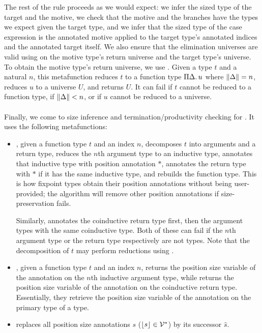 The rest of the rule proceeds as we would expect: we infer the sized type of the target and the motive, we check that the motive and the branches have the types we expect given the target type, and we infer that the sized type of the case expression is the annotated motive applied to the target type's annotated indices and the annotated target itself.
We also ensure that the elimination universes are valid using \elim on the motive type's return universe and the target type's universe.
To obtain the motive type's return universe, we use \decompose.
Given a type $t$ and a natural $n$, this metafunction reduces $t$ to a function type $\Pi \Delta \mathpunct{.} u$ where $\lVert\Delta\rVert = n$, reduces $u$ to a universe $U$, and returns $U$.
It can fail if $t$ cannot be reduced to a function type, if $\lVert\Delta\rVert < n$, or if $u$ cannot be reduced to a universe.

\paragraph*{} Finally, we come to size inference and termination/productivity checking for \cofixpoints.
It uses the following metafunctions:
\begin{itemize}
  \item \setrecstars, given a function type $t$ and an index $n$, decomposes $t$ into arguments and a return type, reduces the $n$th argument type to an inductive type, annotates that inductive type with position annotation $*$, annotates the return type with $*$ if it has the same inductive type, and rebuilds the function type.
    This is how fixpoint types obtain their position annotations without being user-provided; the algorithm will remove other position annotations if size-preservation fails.
    
    Similarly, \setcorecstars annotates the coinductive return type first, then the argument types with the same coinductive type.
    Both of these can fail if the $n$th argument type or the return type respectively are not \coinductive types.
    Note that the decomposition of $t$ may perform reductions using \whnf.
  \item \getrecvar, given a function type $t$ and an index $n$, returns the position size variable of the annotation on the $n$th inductive argument type, while \getcorecvar returns the position size variable of the annotation on the coinductive return type.
    Essentially, they retrieve the position size variable of the annotation on the primary \corecursive type of a \cofixpoint type.
  \item \shift replaces all position size annotations $s$ (\ie $\lfloor s\rfloor \in \mathcal{V}^*$) by its successor $\hat{s}$.
\end{itemize}

